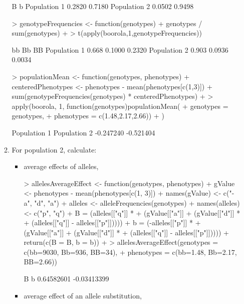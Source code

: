 \documentclass[12pt,a4paper]{paper}
\begin{document}
\begin{enumerate}
\begin{enumerate}
\begin{Schunk}
\begin{Sinput}
\end{Sinput}
\begin{Soutput}
                  B      b
Population 1 0.2820 0.7180
Population 2 0.0502 0.9498
\end{Soutput}
\begin{Sinput}
> genotypeFrequencies <- function(genotypes){
+   genotypes / sum(genotypes)
+ }
> t(apply(boorola,1,genotypeFrequencies))
\end{Sinput}
\begin{Soutput}
                bb     Bb     BB
Population 1 0.668 0.1000 0.2320
Population 2 0.903 0.0936 0.0034
\end{Soutput}
\begin{Sinput}
> populationMean <- function(genotypes, phenotypes){
+   centeredPhenotypes <- phenotypes - mean(phenotypes[c(1,3)])
+   sum(genotypeFrequencies(genotypes) * centeredPhenotypes)
+ }
> apply(boorola, 1, function(genotypes){populationMean(
+   genotypes = genotypes,
+   phenotypes = c(1.48,2.17,2.66))
+   })
\end{Sinput}
\begin{Soutput}
Population 1 Population 2 
   -0.247240    -0.521404 
\end{Soutput}
\end{Schunk}
\item For population 2, calculate:
\begin{itemize}
\item average effects of alleles,
\begin{Schunk}
\begin{Sinput}
> allelesAverageEffect <- function(genotypes, phenotypes){
+   gValue <- phenotypes - mean(phenotypes[c(1, 3)])
+   names(gValue) <- c("-a", "d", "a")
+   alleles <- alleleFrequencies(genotypes)
+   names(alleles) <- c("p", "q")
+   B = (alleles[["q"]] *
+   (gValue[["a"]] + (gValue[["d"]] *
+   (alleles[["q"]] - alleles[["p"]]))))
+   b = (-alleles[["p"]] *
+   (gValue[["a"]] + (gValue[["d"]] *
+   (alleles[["q"]] - alleles[["p"]]))))
+   return(c(B = B, b = b))
+ }
> allelesAverageEffect(genotypes = c(bb=9030, Bb=936, BB=34),
+                      phenotypes = c(bb=1.48, Bb=2.17, BB=2.66))
\end{Sinput}
\begin{Soutput}
          B           b 
 0.64582601 -0.03413399 
\end{Soutput}
\end{Schunk}
\item average effect of an allele substitution, 
\begin{Schunk}

\end{Schunk}
\end{itemize}
\end{enumerate}
\end{enumerate}
\end{document}
